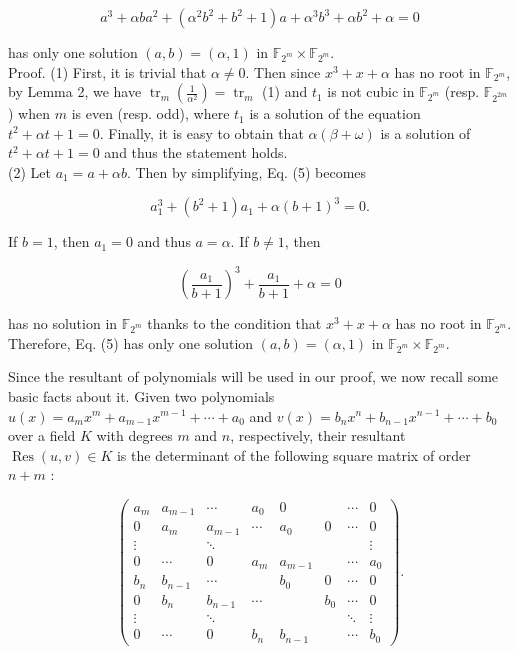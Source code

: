 \documentclass[10pt]{article}
\begin{document}
\begin{equation*}
a^{3}+\alpha b a^{2}+\left(\alpha^{2} b^{2}+b^{2}+1\right) a+\alpha^{3} b^{3}+\alpha b^{2}+\alpha=0 \tag{5}
\end{equation*}


has only one solution $(a, b)=(\alpha, 1)$ in $\mathbb{F}_{2^{m}} \times \mathbb{F}_{2^{m}}$.\\
Proof. (1) First, it is trivial that $\alpha \neq 0$. Then since $x^{3}+x+\alpha$ has no root in $\mathbb{F}_{2^{m}}$, by Lemma 2, we have $\operatorname{tr}_{m}\left(\frac{1}{\alpha^{2}}\right)=\operatorname{tr}_{m}$ (1) and $t_{1}$ is not cubic in $\mathbb{F}_{2^{m}}$ (resp. $\mathbb{F}_{2^{2 m}}$ ) when $m$ is even (resp. odd), where $t_{1}$ is a solution of the equation $t^{2}+\alpha t+1=0$. Finally, it is easy to obtain that $\alpha(\beta+\omega)$ is a solution of $t^{2}+\alpha t+1=0$ and thus the statement holds.\\
(2) Let $a_{1}=a+\alpha b$. Then by simplifying, Eq. (5) becomes

$$
a_{1}^{3}+\left(b^{2}+1\right) a_{1}+\alpha(b+1)^{3}=0 .
$$

If $b=1$, then $a_{1}=0$ and thus $a=\alpha$. If $b \neq 1$, then

$$
\left(\frac{a_{1}}{b+1}\right)^{3}+\frac{a_{1}}{b+1}+\alpha=0
$$

has no solution in $\mathbb{F}_{2^{m}}$ thanks to the condition that $x^{3}+x+\alpha$ has no root in $\mathbb{F}_{2^{m}}$. Therefore, Eq. (5) has only one solution $(a, b)=(\alpha, 1)$ in $\mathbb{F}_{2^{m}} \times \mathbb{F}_{2^{m}}$.

Since the resultant of polynomials will be used in our proof, we now recall some basic facts about it. Given two polynomials $u(x)=a_{m} x^{m}+a_{m-1} x^{m-1}+\cdots+a_{0}$ and $v(x)=b_{n} x^{n}+b_{n-1} x^{n-1}+\cdots+b_{0}$ over a field $K$ with degrees $m$ and $n$, respectively, their resultant $\operatorname{Res}(u, v) \in K$ is the determinant of the following square matrix of order $n+m$ :

$$
\left(\begin{array}{cccccccc}
a_{m} & a_{m-1} & \cdots & a_{0} & 0 & & \cdots & 0 \\
0 & a_{m} & a_{m-1} & \cdots & a_{0} & 0 & \cdots & 0 \\
\vdots & & \ddots & & & & & \vdots \\
0 & \cdots & 0 & a_{m} & a_{m-1} & & \cdots & a_{0} \\
b_{n} & b_{n-1} & \cdots & & b_{0} & 0 & \cdots & 0 \\
0 & b_{n} & b_{n-1} & \cdots & & b_{0} & \cdots & 0 \\
\vdots & & \ddots & & & & \ddots & \vdots \\
0 & \cdots & 0 & b_{n} & b_{n-1} & & \cdots & b_{0}
\end{array}\right) .
$$
\end{document}

